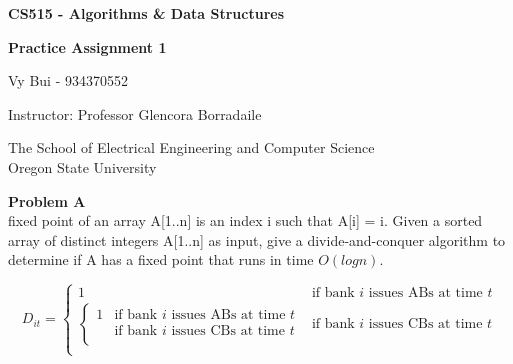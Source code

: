 \documentclass[12pt,article]{article}
\newenvironment{problem}[2][Problem]
    { \begin{mdframed}[backgroundcolor=gray!20] \textbf{#1 #2} \\}
    {  \end{mdframed}}
\begin{document}
\begin{titlepage}
    \begin{center}
        \vspace*{4cm}

        \textbf{\Large CS515 - Algorithms \& Data Structures}

        \vspace{0.5cm}
 
        \textbf{\Large Practice Assignment 1}
 
        \vspace{1cm}

        Vy Bui - 934370552

        \vspace{2cm}

        Instructor: Professor Glencora Borradaile
        \vfill
             
        \vspace{0.8cm}
      
             
        The School of Electrical Engineering and Computer Science\\
        Oregon State University\\
             
    \end{center}
\end{titlepage}

\begin{problem}{1} 
A fixed point of an array A[1..n] is an index i such that A[i] = i. Given a sorted array of distinct integers A[1..n] as input, give a divide-and-conquer algorithm to determine if A has a fixed point that runs in time $O(log n)$.
\end{problem}

\begin{equation}
    D_{it} =
      \begin{cases}
        1 & \text{if bank $i$ issues ABs at time $t$}\\
        \begin{cases}
            1 & \text{if bank $i$ issues ABs at time $t$}\\
             & \text{if bank $i$ issues CBs at time $t$}\\
          \end{cases}        & \text{if bank $i$ issues CBs at time $t$}\\
      \end{cases}       
  \end{equation}
\end{document}
